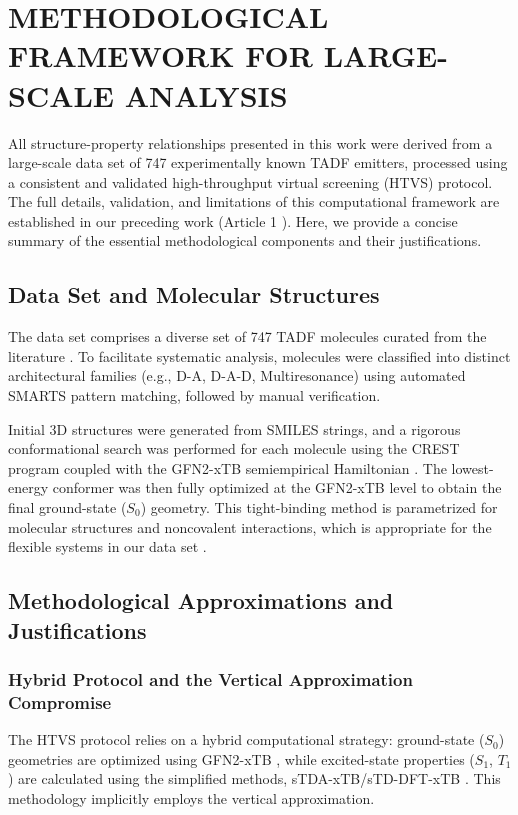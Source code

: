 \documentclass[journal=jcisd8,manuscript=article,keywords=true]{achemso}
\begin{document}
\section{METHODOLOGICAL FRAMEWORK FOR LARGE-SCALE ANALYSIS}\label{sec:methods}

All structure-property relationships presented in this work were derived from a large-scale data set of \num{747} experimentally known TADF emitters, processed using a consistent and validated high-throughput virtual screening (HTVS) protocol. The full details, validation, and limitations of this computational framework are established in our preceding work (Article 1 \cite{TchapetArxivA1-2025}). Here, we provide a concise summary of the essential methodological components and their justifications.

\subsection{Data Set and Molecular Structures}

The data set comprises a diverse set of \num{747} TADF molecules curated from the literature \cite{Huang_2024}. To facilitate systematic analysis, molecules were classified into distinct architectural families (e.g., D-A, D-A-D, Multiresonance) using automated SMARTS pattern matching, followed by manual verification.

Initial 3D structures were generated from SMILES strings, and a rigorous conformational search was performed for each molecule using the CREST program coupled with the GFN2-xTB semiempirical Hamiltonian \cite{pracht2020automated, Bannwarth2019}. The lowest-energy conformer was then fully optimized at the GFN2-xTB level to obtain the final ground-state ($S_0$) geometry. This tight-binding method is parametrized for molecular structures and noncovalent interactions, which is appropriate for the flexible systems in our data set \cite{bannwarth2021extended}.

\subsection{Methodological Approximations and Justifications}

\subsubsection{Hybrid Protocol and the Vertical Approximation Compromise}

The HTVS protocol relies on a hybrid computational strategy: ground-state ($S_0$) geometries are optimized using GFN2-xTB \cite{Bannwarth2019, Ehlert2021}, while excited-state properties ($S_1$, $T_1$) are calculated using the simplified methods, sTDA-xTB/sTD-DFT-xTB \cite{Grimme2016, Wergifosse2024}. This methodology implicitly employs the vertical approximation.
\end{document}
